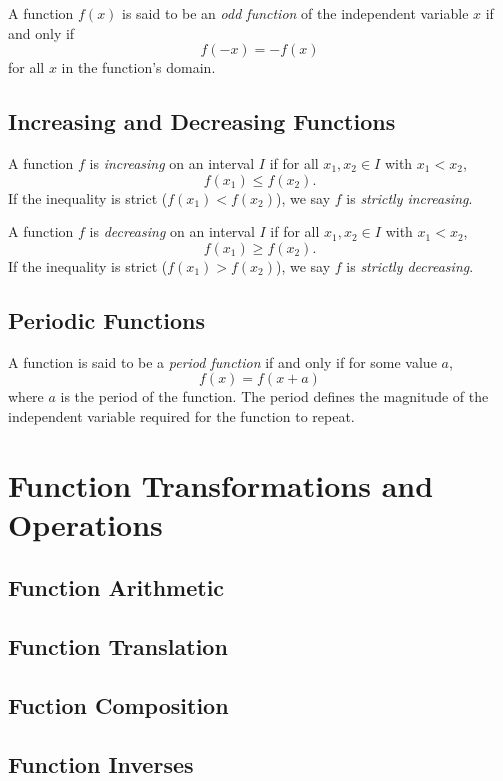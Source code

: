         \begin{definition}
            A function $f(x)$ is said to be an \textit{odd function} of the independent variable $x$ if and only if
            $$
            f(-x) = -f(x)
            $$
            for all $x$ in the function's domain.
        \end{definition}

        \subsection{Increasing and Decreasing Functions}
        \begin{definition}
            A function $f$ is \textit{increasing} on an interval $I$ if for all $x_1, x_2 \in I$ with $x_1 < x_2$,
            $$
            f(x_1) \leq f(x_2).
            $$
            If the inequality is strict ($f(x_1) < f(x_2)$), we say $f$ is \textit{strictly increasing}.
        \end{definition}

        \begin{definition}
            A function $f$ is \textit{decreasing} on an interval $I$ if for all $x_1, x_2 \in I$ with $x_1 < x_2$,
            $$
            f(x_1) \geq f(x_2).
            $$
            If the inequality is strict ($f(x_1) > f(x_2)$), we say $f$ is \textit{strictly decreasing}.
        \end{definition}

        \subsection{Periodic Functions}
        \label{sect:periodicfunctions}
        \begin{definition}
            A function is said to be a \textit{period function} if and only if for some value $a$,
            $$
            f(x) = f(x+a)
            $$
            where $a$ is the period of the function. The period defines the magnitude of the independent variable required for the function to repeat.
        \end{definition}

        \section{Function Transformations and Operations}
        \subsection{Function Arithmetic}
        \subsection{Function Translation}
        \subsection{Fuction Composition}
        \subsection{Function Inverses}
        \label{sect:function inverses}
